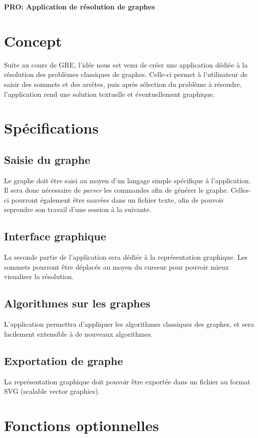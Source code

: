 \documentclass[french]{article}
\begin{document}
	\centering
	\large{\textbf{PRO: Application de résolution de graphes}}
	
	\justify
	
	\section{Concept}
		Suite au cours de GRE, l'idée nous est venu de créer une application dédiée à la résolution des problèmes classiques de graphes. Celle-ci permet à l'utilisateur de saisir des sommets et des arrêtes, puis après sélection du problème à résoudre, l'application rend une solution textuelle et éventuellement graphique.
		
	\section{Spécifications}
		\subsection{Saisie du graphe}
			Le graphe doit être saisi au moyen d'un langage simple spécifique à l'application. Il sera donc nécessaire de \textit{parser} les commandes afin de générer le graphe. Celles-ci pourront également être sauvées dans un fichier texte, afin de pouvoir reprendre son travail d'une session à la suivante.
		
		\subsection{Interface graphique}
			La seconde partie de l'application sera dédiée à la représentation graphique. Les sommets pourront être déplacés au moyen du curseur pour pouvoir mieux visualiser la résolution.
			
		\subsection{Algorithmes sur les graphes}
			L'application permettra d'appliquer les algorithmes classiques des graphes, et sera facilement extensible à de nouveaux algorithmes. 
		
		\subsection{Exportation de graphe}
			La représentation graphique doit pouvoir être exportée dans un fichier au format SVG (scalable vector graphics).
		
	\section{Fonctions optionnelles}
\end{document}
